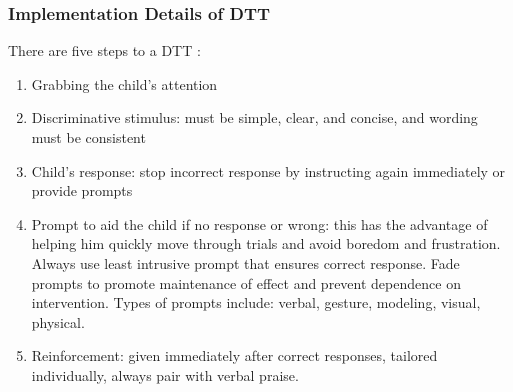 \documentclass{ut-thesis}
\begin{document}
\subsubsection{Implementation Details of DTT}
There are five steps to a DTT \cite{bogin2010steps}:
\begin{enumerate}
	\item Grabbing the child's attention
	\item Discriminative stimulus: must be simple, clear, and concise, and wording must be consistent
	\item Child's response: stop incorrect response by instructing again immediately or provide prompts
	\item Prompt to aid the child if no response or wrong: this has the advantage of helping him quickly move through trials and avoid boredom and frustration.  Always use least intrusive prompt that ensures correct response.  Fade prompts to promote maintenance of effect and prevent dependence on intervention.  Types of prompts include: verbal, gesture, modeling, visual, physical.
	\item Reinforcement: given immediately after correct responses, tailored individually, always pair with verbal praise.
\end{enumerate}


\end{document}

